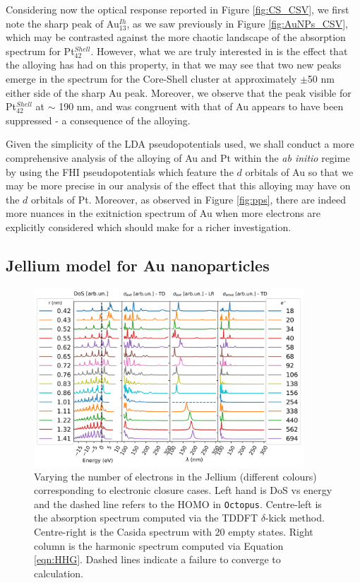 Considering now the optical response reported in Figure \ref{fig:CS_CSV}, we first note the sharp peak of Au$_{13}^{Ih}$, as we saw previously in Figure \ref{fig:AuNPs_CSV}, which may be contrasted against the more chaotic landscape of the absorption spectrum for Pt$_{42}^{Shell}$. However, what we are truly interested in is the effect that the alloying has had on this property, in that we may see that two new peaks emerge in the spectrum for the Core-Shell cluster at approximately $\pm$50 nm either side of the sharp Au peak. Moreover, we observe that the peak visible for Pt$_{42}^{Shell}$ at $\sim$ 190 nm, and was congruent with that of Au appears to have been suppressed -  a consequence of the alloying.

Given the simplicity of the LDA pseudopotentials used, we shall conduct a more comprehensive analysis of the alloying of Au and Pt within the \textit{ab initio} regime by using the FHI pseudopotentials which feature the $d$ orbitals of Au so that we may be more precise in our analysis of the effect that this alloying may have on the $d$ orbitals of Pt. Moreover, as observed in Figure \ref{fig:pps}, there are indeed more nuances in the exitniction spectrum of Au when more electrons are explicitly considered which should make for a richer investigation.

\subsection{Jellium model for Au nanoparticles}
\label{sec:Res_JLM}

\begin{figure}[ht!]
    \includegraphics[width=0.9\textwidth]{figures/LM/JLM/Sizes_Jlm.png}
    \caption{Varying the number of electrons in the Jellium (different colours) corresponding to electronic closure cases. Left hand is DoS vs energy and the dashed line refers to the HOMO in \texttt{Octopus}. Centre-left is the absorption spectrum computed via the TDDFT $\delta$-kick method. Centre-right is the Casida spectrum with 20 empty states. Right column is the harmonic spectrum computed via Equation \ref{eqn:HHG}. Dashed lines indicate a failure to converge to calculation.}
    \label{Fig:Jlm_Sizes}
\end{figure}

